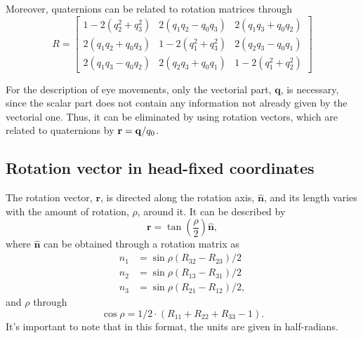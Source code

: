 Moreover, quaternions can be related to rotation matrices through
\begin{equation}
	R=\left[\begin{array}{lll}{1-2\left(q_{2}^{2}+q_{3}^{2}\right)} & {2\left(q_{1} q_{2}-q_{0} q_{3}\right)} & {2\left(q_{1} q_{3}+q_{0} q_{2}\right)} \\ {2\left(q_{1} q_{2}+q_{0} q_{3}\right)} & {1-2\left(q_{1}^{2}+q_{3}^{2}\right)} & {2\left(q_{2} q_{3}-q_{0} q_{1}\right)} \\ {2\left(q_{1} q_{3}-q_{0} q_{2}\right)} & {2\left(q_{2} q_{3}+q_{0} q_{1}\right)} & {1-2\left(q_{1}^{2}+q_{2}^{2}\right)}\end{array}\right]
\end{equation}

For the description of eye movements, only the vectorial part, $\mathbf{q}$, is necessary, since the scalar part does not contain any information not already given by the vectorial one. Thus, it can be eliminated by using rotation vectors, which are related to quaternions  by $ \mathbf{r}  = {\bf q} / q _ { 0 }$.

\subsection{Rotation vector in head-fixed coordinates}
\label{killme}

The rotation vector, $\mathbf{r}$, is directed along the rotation axis, $\hat{\mathbf{n}}$, and its length varies with the amount of rotation, $\rho$, around it. It can be described by 
\begin{equation}
\mathbf{r} = \tan (\frac{\rho}{2}) \hat{ \mathbf{n}},
\end{equation}
where $\hat{ \mathbf{n}}$ can be obtained through a rotation matrix as
\begin{equation}
\label{sec2:eq:n}
\begin{aligned} 
n_ { 1 } & = \sin \rho \left( R _ { 32 } - R _ { 23 } \right) / 2  \\ 
n _ { 2 } & = \sin \rho \left( R _ { 13 } - R _ { 31 } \right) / 2  \\ 
n _ { 3 } & = \sin \rho \left( R _ { 21 } - R _ { 12 } \right) / 2 ,
\end{aligned}
\end{equation}
and $\rho$ through
\begin{equation}
\cos \rho = 1 / 2 \cdot \left( R _ { 11 } + R _ { 22 } + R _ { 33 } - 1 \right).
\end{equation}
It's important to note that in this format, the units are given in half-radians.
